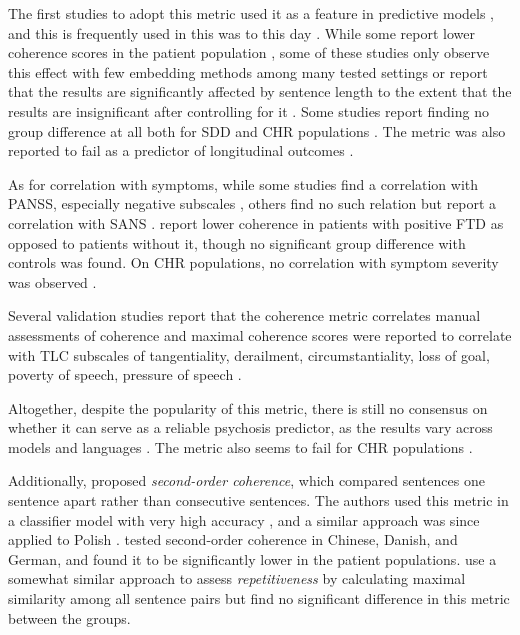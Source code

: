 The first studies to adopt this metric used it as a feature in predictive models \citep{bedi2015automated, rosenstein2015language}, and this is frequently used in this was to this day \citep{sarzynska2021detecting, tang2022clinical, tang2023latent}. While some report lower coherence scores in the patient population \citep{just2019coherence, morgan2021natural}, some of these studies only observe this effect with few embedding methods among many tested settings \citep{iter2018automatic, just2019coherence, ryazanskaya2020thesis} or report that the results are significantly affected by sentence length to the extent that the results are insignificant after controlling for it \citep{just2019coherence}. Some studies report finding no group difference at all both for SDD \citep{just2020modeling} and CHR populations \citep{hitczenko2021understanding, bilgrami2022construct, haas2020linking}. The metric was also reported to fail as a predictor of longitudinal outcomes \citep{just2023validation}.

As for correlation with symptoms, while some studies find a correlation with PANSS, especially negative subscales \citep{ryazanskaya2020thesis, just2023validation}, others find no such relation but report a correlation with SANS \citep{parola2022speech}. \citet{just2020modeling} report lower coherence in patients with positive FTD as opposed to patients without it, though no significant group difference with controls was found. On CHR populations, no correlation with symptom severity was observed \citep{hitczenko2021understanding}.

Several validation studies report that the coherence metric correlates manual assessments of coherence \citep{xu2020centroid, xu2022fully} and maximal coherence scores were reported to correlate with TLC subscales of tangentiality, derailment, circumstantiality, loss of goal, poverty of speech, pressure of speech \citep{bilgrami2022construct}.

Altogether, despite the popularity of this metric, there is still no consensus on whether it can serve as a reliable psychosis predictor, as the results vary across models \citep{iter2018automatic, just2019coherence, ryazanskaya2020thesis} and languages \citep{just2020modeling, parola2022speech}. The metric also seems to fail for CHR populations \citep{hitczenko2021understanding, bilgrami2022construct, haas2020linking}.

Additionally, \citet{bedi2015automated} proposed \textit{second-order coherence}, which compared sentences one sentence apart rather than consecutive sentences. The authors used this metric in a classifier model with very high accuracy \citep{bedi2015automated}, and a similar approach was since applied to Polish \citep{sarzynska2021detecting}. \citet{parola2022speech} tested second-order coherence in Chinese, Danish, and German, and found it to be significantly lower in the patient populations. \citet{morgan2021natural} use a somewhat similar approach to assess \textit{repetitiveness} by calculating maximal similarity among all sentence pairs but find no significant difference in this metric between the groups.


